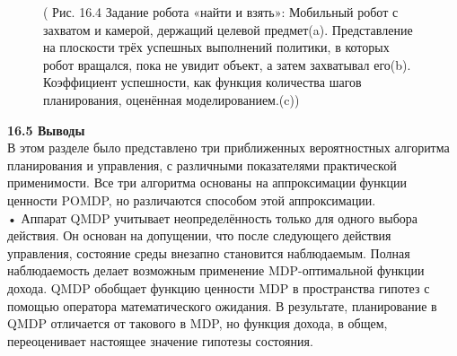 \documentclass[10pt,a4paper]{article}
\begin{document}
\begin{figure}[H]
	\caption{ ( Рис. 16.4 Задание робота «найти и взять»: Мобильный робот с захватом и камерой, держащий целевой предмет(a).  Представление на плоскости трёх успешных выполнений политики, в которых робот вращался, пока не увидит объект, а затем захватывал его(b). Коэффициент успешности, как функция количества шагов планирования, оценённая моделированием.(c)) }
	\label{fig:164orig}
\end{figure}

\textbf{16.5	Выводы}\\

В этом разделе было представлено три приближенных вероятностных алгоритма планирования и управления, с различными показателями практической применимости. Все три алгоритма основаны на аппроксимации функции ценности POMDP, но различаются способом этой аппроксимации.\\

•	Аппарат QMDP учитывает неопределённость только для одного выбора действия. Он основан на допущении, что после следующего действия управления, состояние среды внезапно становится наблюдаемым. Полная наблюдаемость делает возможным применение MDP-оптимальной функции дохода. QMDP обобщает функцию ценности MDP в пространства гипотез с помощью оператора математического ожидания. В результате, планирование в QMDP отличается от такового в MDP, но функция дохода, в общем, переоценивает настоящее значение гипотезы состояния.\\
\end{document}
